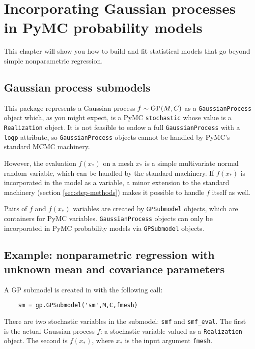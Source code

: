 \chapter{Incorporating Gaussian processes in PyMC probability models}\label{cha:PyMC}
This chapter will show you how to build and fit statistical models that go beyond simple nonparametric regression.






\section{Gaussian process submodels}

This package represents a Gaussian process $f\sim \textup{GP}(M,C)$ as a \texttt{GaussianProcess} object which, as you might expect, is a PyMC \texttt{stochastic} whose value is a \texttt{Realization} object. It is not feasible to endow a full \texttt{GaussianProcess} with a \texttt{logp} attribute, so \texttt{GaussianProcess} objects cannot be handled by PyMC's standard MCMC machinery.

However, the evaluation $f(x_*)$ on a mesh $x_*$ is a simple multivariate normal random variable, which can be handled by the standard machinery. If $f(x_*)$ is incorporated in the model as a variable, a minor extension to the standard machinery (section \ref{sec:step-methods}) makes it possible to handle $f$ itself as well.

Pairs of $f$ and $f(x_*)$ variables are created by \texttt{GPSubmodel} objects, which are containers for PyMC variables. \texttt{GaussianProcess} objects can only be incorporated in PyMC probability models via \texttt{GPSubmodel} objects.






\section{Example: nonparametric regression with unknown mean and covariance parameters}\label{sub:BasicMCMC}

A GP submodel is created in  with the following call:
\begin{verbatim}
    sm = gp.GPSubmodel('sm',M,C,fmesh)
\end{verbatim}
There are two stochastic variables in the submodel: \texttt{smf} and \texttt{smf_eval}. The first is the actual Gaussian process $f$: a stochastic variable valued as a \texttt{Realization} object. The second is $f(x_*)$, where $x_*$ is the input argument \texttt{fmesh}.

